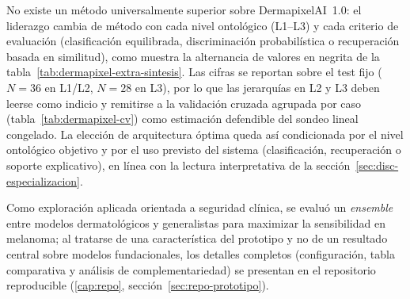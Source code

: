 No existe un método universalmente superior sobre DermapixelAI~1.0: el
liderazgo cambia de método con cada nivel ontológico (L1--L3) y cada
criterio de evaluación (clasificación equilibrada, discriminación
probabilística o recuperación basada en similitud), como muestra la
alternancia de valores en negrita de la
tabla~\ref{tab:dermapixel-extra-sintesis}. Las cifras se reportan sobre
el test fijo ($N = 36$ en L1/L2, $N = 28$ en L3), por lo que las
jerarquías en L2 y L3 deben leerse como indicio y remitirse a la
validación cruzada agrupada por caso (tabla~\ref{tab:dermapixel-cv})
como estimación defendible del sondeo lineal congelado. La elección de
arquitectura óptima queda así condicionada por el nivel ontológico
objetivo y por el uso previsto del sistema (clasificación, recuperación
o soporte explicativo), en línea con la lectura interpretativa de la
sección~\ref{sec:disc-especializacion}.

Como exploración aplicada orientada a seguridad clínica, se evaluó un
\emph{ensemble} entre modelos dermatológicos y generalistas para
maximizar la sensibilidad en melanoma; al tratarse de una característica
del prototipo y no de un resultado central sobre modelos fundacionales,
los detalles completos (configuración, tabla comparativa y análisis de
complementariedad) se presentan en el repositorio reproducible
(\ref{cap:repo}, sección~\ref{sec:repo-prototipo}).
